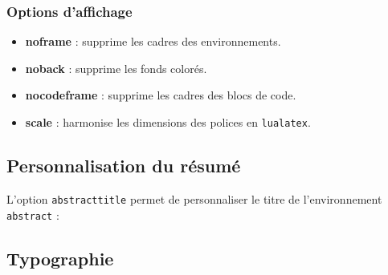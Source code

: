 \documentclass[
    french,
    margin=2cm
]{neoschool}
\begin{document}
\subsubsection{Options d'affichage}

\begin{itemize}
\item \textbf{noframe} : supprime les cadres des environnements.
\item \textbf{noback} : supprime les fonds colorés.
\item \textbf{nocodeframe} : supprime les cadres des blocs de code.
\item \textbf{scale} : harmonise les dimensions des polices en \texttt{lualatex}.
\end{itemize}

\subsection{Personnalisation du résumé}

L'option \texttt{abstracttitle} permet de personnaliser
le titre de l'environnement \texttt{abstract} :


\subsection{Typographie}
\end{document}
